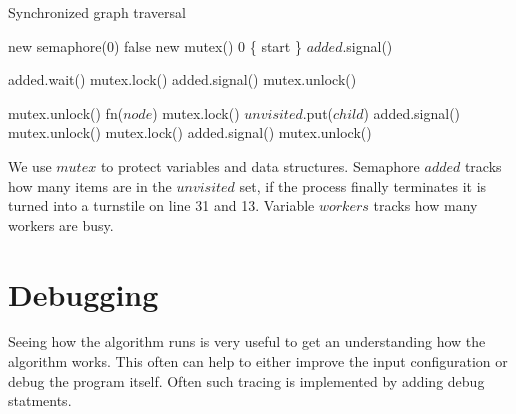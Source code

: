 \begin{algorithm}[H]
    \caption{Synchronized graph traversal}
\begin{algorithmic}[1]

             {new semaphore(0)}
         {false}
             {new mutex()}
           {0}
         {\{ start \}}
        \State $added$.signal()
        
        \Spawn
                \State added.wait()
                \State mutex.lock()
                    \State added.signal()
                    \State mutex.unlock()
                \EndIf

                \State mutex.unlock()
                \Statex
                \State fn($node$)
                \Statex
                    \State mutex.lock()
                        \State $unvisited$.put($child$)
                        \State added.signal()
                    \EndIf
                    \State mutex.unlock()
                \EndFor
                \Statex
                \State mutex.lock()
                    \State added.signal()
                \EndIf
                \State mutex.unlock()
            \EndWhile
        \EndSpawn

    \EndFunction
\end{algorithmic}
\end{algorithm}

We use $mutex$ to protect variables and data structures. Semaphore $added$ tracks how many items are in the $unvisited$ set, if the process finally terminates it is turned into a turnstile on line 31 and 13. Variable $workers$ tracks how many workers are busy.

\section{Debugging}

Seeing how the algorithm runs is very useful to get an understanding how the algorithm works. This often can help to either improve the input configuration or debug the program itself. Often such tracing is implemented by adding debug statments.

